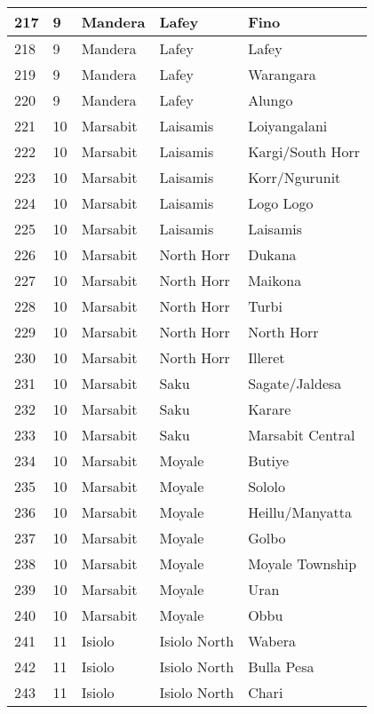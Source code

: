 \begin{table}[!ht]
\begin{tabular}{|l|l|l|l|l|}
        217 & 9 & Mandera & Lafey & Fino \\ \hline
        218 & 9 & Mandera & Lafey & Lafey \\ \hline
        219 & 9 & Mandera & Lafey & Warangara \\ \hline
        220 & 9 & Mandera & Lafey & Alungo \\ \hline
        221 & 10 & Marsabit & Laisamis & Loiyangalani \\ \hline
        222 & 10 & Marsabit & Laisamis & Kargi/South Horr \\ \hline
        223 & 10 & Marsabit & Laisamis & Korr/Ngurunit \\ \hline
        224 & 10 & Marsabit & Laisamis & Logo Logo \\ \hline
        225 & 10 & Marsabit & Laisamis & Laisamis \\ \hline
        226 & 10 & Marsabit & North Horr & Dukana \\ \hline
        227 & 10 & Marsabit & North Horr & Maikona \\ \hline
        228 & 10 & Marsabit & North Horr & Turbi \\ \hline
        229 & 10 & Marsabit & North Horr & North Horr \\ \hline
        230 & 10 & Marsabit & North Horr & Illeret \\ \hline
        231 & 10 & Marsabit & Saku & Sagate/Jaldesa \\ \hline
        232 & 10 & Marsabit & Saku & Karare \\ \hline
        233 & 10 & Marsabit & Saku & Marsabit Central \\ \hline
        234 & 10 & Marsabit & Moyale & Butiye \\ \hline
        235 & 10 & Marsabit & Moyale & Sololo \\ \hline
        236 & 10 & Marsabit & Moyale & Heillu/Manyatta \\ \hline
        237 & 10 & Marsabit & Moyale & Golbo \\ \hline
        238 & 10 & Marsabit & Moyale & Moyale Township \\ \hline
        239 & 10 & Marsabit & Moyale & Uran \\ \hline
        240 & 10 & Marsabit & Moyale & Obbu \\ \hline
        241 & 11 & Isiolo & Isiolo North & Wabera \\ \hline
        242 & 11 & Isiolo & Isiolo North & Bulla Pesa \\ \hline
        243 & 11 & Isiolo & Isiolo North & Chari \\ \hline

\end{tabular}
\end{table}
